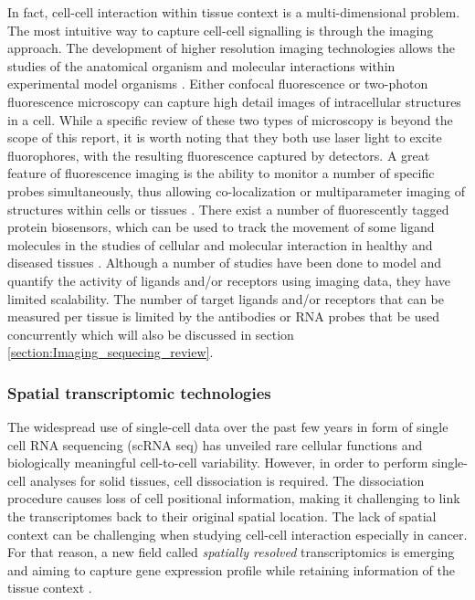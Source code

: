 In fact, cell-cell interaction within tissue context is a multi-dimensional problem. The most intuitive way to capture cell-cell signalling is through the imaging approach. The development of higher resolution imaging technologies allows the studies of the anatomical organism and molecular interactions within experimental model organisms \cite{osswald2013insights}. Either confocal fluorescence or two-photon fluorescence microscopy can capture high detail images of intracellular structures in a cell. While a specific review of these two types of microscopy is beyond the scope of this report, it is worth noting that they both use laser light to excite fluorophores, with the resulting fluorescence captured by detectors. A great feature of fluorescence imaging is the ability to monitor a number of specific probes simultaneously, thus allowing co-localization or multiparameter imaging of structures within cells or tissues \cite{periasamy2013methods}. There exist a number of fluorescently tagged protein biosensors, which can be used to track the movement of some ligand molecules in the studies of cellular and molecular interaction in healthy and diseased tissues \cite{gerdes2013cell}. Although a number of studies have been done to model and quantify the activity of ligands and/or receptors \cite{awaji1998real, go1997quantitative, maamra1999studies, sneddon2003activation, bohme2009illuminating} using imaging data, they have limited scalability. The number of target ligands and/or receptors that can be measured per tissue is limited by the antibodies or RNA probes that be used concurrently which will also be discussed in section \ref{section:Imaging_sequecing_review}. 


\subsubsection{Spatial transcriptomic technologies}
The widespread use of single-cell data over the past few years in form of single cell RNA sequencing (scRNA seq) has unveiled rare cellular functions and biologically meaningful cell-to-cell variability. However, in order to perform single-cell analyses for solid tissues, cell dissociation is required. The dissociation procedure causes loss of cell positional information, making it challenging to link the transcriptomes back to their original spatial location. The lack of spatial context can be challenging when studying cell-cell interaction especially in cancer. For that reason, a new field called \textit{spatially resolved} transcriptomics is emerging and aiming to capture gene expression profile while retaining information of the tissue context \cite{burgess2019spatial}. 

